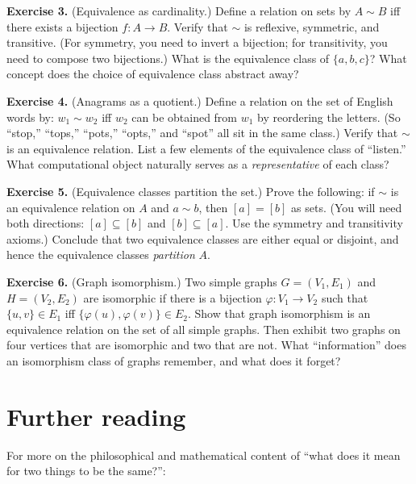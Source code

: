 \documentclass[11pt]{article}
\begin{document}
\bigskip
\textbf{Exercise 3.}\label{ex:equiv:3} (Equivalence as cardinality.) Define a relation on sets by $A \sim B$ iff there exists a bijection $f : A \to B$. Verify that $\sim$ is reflexive, symmetric, and transitive. (For symmetry, you need to invert a bijection; for transitivity, you need to compose two bijections.) What is the equivalence class of $\{a, b, c\}$? What concept does the choice of equivalence class abstract away?

\bigskip
\textbf{Exercise 4.}\label{ex:equiv:4} (Anagrams as a quotient.) Define a relation on the set of English words by: $w_1 \sim w_2$ iff $w_2$ can be obtained from $w_1$ by reordering the letters. (So ``stop,'' ``tops,'' ``pots,'' ``opts,'' and ``spot'' all sit in the same class.) Verify that $\sim$ is an equivalence relation. List a few elements of the equivalence class of ``listen.'' What computational object naturally serves as a \emph{representative} of each class?

\bigskip
\textbf{Exercise 5.}\label{ex:equiv:5} (Equivalence classes partition the set.) Prove the following: if $\sim$ is an equivalence relation on $A$ and $a \sim b$, then $[a] = [b]$ as sets. (You will need both directions: $[a] \subseteq [b]$ and $[b] \subseteq [a]$. Use the symmetry and transitivity axioms.) Conclude that two equivalence classes are either equal or disjoint, and hence the equivalence classes \emph{partition} $A$.

\bigskip
\textbf{Exercise 6.}\label{ex:equiv:6} (Graph isomorphism.) Two simple graphs $G = (V_1, E_1)$ and $H = (V_2, E_2)$ are isomorphic if there is a bijection $\varphi : V_1 \to V_2$ such that $\{u, v\} \in E_1$ iff $\{\varphi(u), \varphi(v)\} \in E_2$. Show that graph isomorphism is an equivalence relation on the set of all simple graphs. Then exhibit two graphs on four vertices that are isomorphic and two that are not. What ``information'' does an isomorphism class of graphs remember, and what does it forget?

\section*{Further reading}

For more on the philosophical and mathematical content of ``what does it mean for two things to be the same?'':
\end{document}
